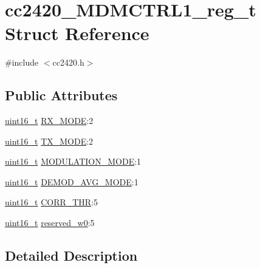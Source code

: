 \hypertarget{structcc2420___m_d_m_c_t_r_l1__reg__t}{}\section{cc2420\+\_\+\+M\+D\+M\+C\+T\+R\+L1\+\_\+reg\+\_\+t Struct Reference}
\label{structcc2420___m_d_m_c_t_r_l1__reg__t}


{\ttfamily \#include $<$cc2420.\+h$>$}

\subsection*{Public Attributes}
\begin{DoxyCompactItemize}
\item 
\hyperlink{_p_e___types_8h_a1f1825b69244eb3ad2c7165ddc99c956}{uint16\+\_\+t} \hyperlink{structcc2420___m_d_m_c_t_r_l1__reg__t_a456f3a71cad0d6f0ad0b2893a0a9360b}{R\+X\+\_\+\+M\+O\+DE}\+:2
\item 
\hyperlink{_p_e___types_8h_a1f1825b69244eb3ad2c7165ddc99c956}{uint16\+\_\+t} \hyperlink{structcc2420___m_d_m_c_t_r_l1__reg__t_aa74bf932402f2d9eed73e579d64634f8}{T\+X\+\_\+\+M\+O\+DE}\+:2
\item 
\hyperlink{_p_e___types_8h_a1f1825b69244eb3ad2c7165ddc99c956}{uint16\+\_\+t} \hyperlink{structcc2420___m_d_m_c_t_r_l1__reg__t_ae349cbd97a630e7245d664838d0742db}{M\+O\+D\+U\+L\+A\+T\+I\+O\+N\+\_\+\+M\+O\+DE}\+:1
\item 
\hyperlink{_p_e___types_8h_a1f1825b69244eb3ad2c7165ddc99c956}{uint16\+\_\+t} \hyperlink{structcc2420___m_d_m_c_t_r_l1__reg__t_a5adc72d99cdf639cc9b8f187108217f2}{D\+E\+M\+O\+D\+\_\+\+A\+V\+G\+\_\+\+M\+O\+DE}\+:1
\item 
\hyperlink{_p_e___types_8h_a1f1825b69244eb3ad2c7165ddc99c956}{uint16\+\_\+t} \hyperlink{structcc2420___m_d_m_c_t_r_l1__reg__t_a3faf4876c5763cbd1a204ca91dce907e}{C\+O\+R\+R\+\_\+\+T\+HR}\+:5
\item 
\hyperlink{_p_e___types_8h_a1f1825b69244eb3ad2c7165ddc99c956}{uint16\+\_\+t} \hyperlink{structcc2420___m_d_m_c_t_r_l1__reg__t_a00a363fe23a08ddc39d91c58edeb8dac}{reserved\+\_\+w0}\+:5
\end{DoxyCompactItemize}


\subsection{Detailed Description}


